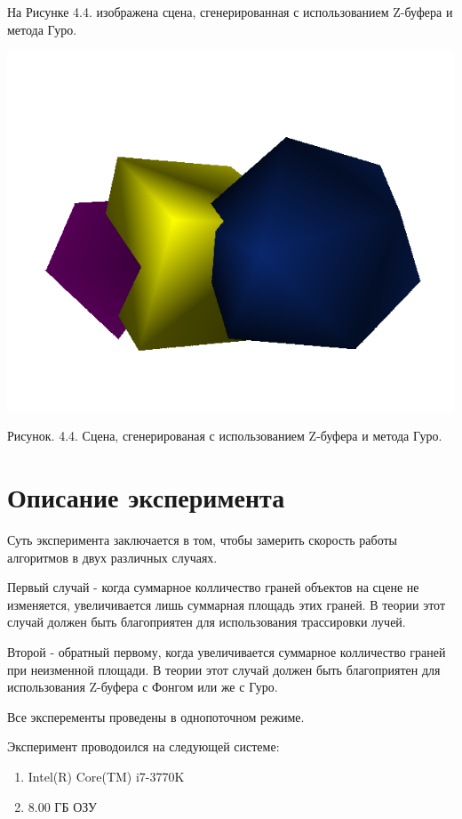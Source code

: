 \documentclass[12pt]{report}
\begin{document}
	На Рисунке 4.4. изображена сцена, сгенерированная с использованием Z-буфера и метода Гуро.

	\begin{center}
		\includegraphics[scale=0.8]{zg.png}
		
		Рисунок. 4.4. Сцена, сгенерированая с использованием Z-буфера и метода Гуро.
	\end{center}

	\section{Описание эксперимента}
	
	Суть эксперимента заключается в том, чтобы замерить скорость работы алгоритмов в 
	двух различных случаях.
	
	Первый случай - когда суммарное колличество граней объектов на сцене не изменяется, увеличивается лишь суммарная площадь этих граней. В теории этот случай должен быть благоприятен для использования трассировки лучей.
	
	Второй - обратный первому, когда увеличивается суммарное колличество граней при неизменной площади. В теории этот случай должен быть благоприятен для использования Z-буфера с Фонгом или же с Гуро.
	
	Все эксперементы проведены в однопоточном режиме.
	
	Эксперимент проводоился на следующей системе:
	\begin{enumerate}
		\item Intel(R) Core(TM) i7-3770K
		\item 8.00 ГБ ОЗУ
	\end{enumerate}
\end{document}
